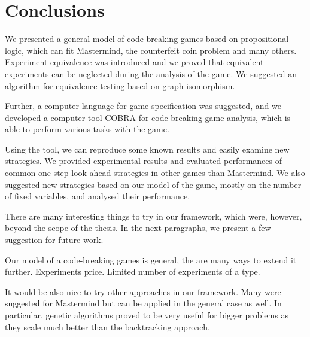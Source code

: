 \chapter{Conclusions}

We presented a general model of code-breaking games based on propositional logic,
  which can fit Mastermind, the counterfeit coin problem and many others.
Experiment equivalence was introduced and we proved that
  equivalent experiments can be neglected during the analysis of the game.
We suggested an algorithm for equivalence testing based on graph isomorphism.

Further, a computer language for game specification was suggested,
  and we developed a computer tool COBRA for code-breaking game analysis,
  which is able to perform various tasks with the game.

Using the tool, we can reproduce some known results and easily examine
  new strategies.
We provided experimental results and evaluated performances of
  common one-step look-ahead strategies in other games than Mastermind.
We also suggested new strategies based on our model of the game,
  mostly on the number of fixed variables, and analysed their performance.

There are many interesting things to try in our framework,
  which were, however, beyond the scope of the thesis.
In the next paragraphs, we present a few suggestion for future work.

Our model of a code-breaking games is general,
  the are many ways to extend it further.
Experiments price.
Limited number of experiments of a type.


It would be also nice to try other approaches in our framework.
Many were suggested for Mastermind but can be applied in the general case as well.
In particular, genetic algorithms proved to be very useful for bigger problems
  as they scale much better than the backtracking approach.
